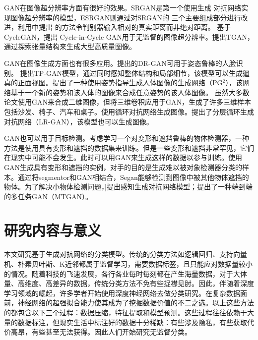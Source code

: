 GAN在图像超分辨率方面有很好的效果。SRGAN\cite{ledig2017photo}是第一个使用生成
对抗网络实现图像超分辨率的模型，ESRGAN\cite{wang2018esrgan}则通过对SRGAN的
三个主要组成部分进行改进，利用\citet{jolicoeur2018relativistic}中提出
的方法令判别器输入相对的真实距离而非绝对距离。
基于CycleGAN\cite{zhu2017unpaired}，\citet{yuan2018unsupervised}提出
Cycle-in-Cycle GAN用于无监督的图像超分辨率。\citet{ding2019tgan}提出TGAN，
通过探索张量结构来生成大型高质量图像。

GAN在图像生成方面也有很多应用。\citet{tran2017disentangled}提出的DR-GAN可用于姿态鲁棒的人脸识别。
\citet{huang2017beyond}提出TP-GAN模型，通过同时感知整体结构和局部细节，该模型可以生成逼真的正面视图。\citet{ma2017pose}提出了一种使用姿势指导生成人体图像的生成网络（PG$^2$），该网络基于一个新的姿势和该人体的图像来合成任意姿势的该人体图像。
虽然大多数论文使用GAN来合成二维图像\cite{bao2017cvae,dong2017semantic}，但\citet{wu2016learning}将三维卷积应用于GAN，生成了许多三维样本包括沙发、椅子、汽车和桌子。\citet{im2016generating}使用循环对抗网络生成图像。\citet{yang2017lr}提出了分层循环生成对抗网络（LR-GAN），该模型也可以生成图像。

GAN也可以用于目标检测。考虑学习一个对变形和遮挡鲁棒的物体检测器，一种方法是使用具有变形和遮挡的数据集来训练。但是一些变形和遮挡非常罕见，它们在现实中可能不会发生。此时可以用GAN来生成这样的数据以参与训练。\citet{wang2017fast}使用GAN生成具有变形和遮挡的实例，对手的目的是生成难以被对象检测器分类的样本。通过将segmentor和GAN相结合，Segan\cite{ehsani2018segan}能够检测到图像中被其他物体遮挡的物体。为了解决小物体检测问题，\citet{li2017perceptual}]提出感知生成对抗网络模型；\citet{bai2018sod}提出了一种端到端的多任务GAN（MTGAN）。

\section{研究内容与意义}
本文研究基于生成对抗网络的分类模型。传统的分类方法如逻辑回归、支持向量机、朴素贝叶斯、K近邻都属于监督学习，需要数据标签，且只能应对数据量较小的情况。随着科技的飞速发展，各行各业每时每刻都在产生海量数据，对于大体量、高维度、高差异的数据，传统分类方法不免有些捉襟见肘。因此，伴随着深度学习领域的崛起，许多学者开始使用深度神经网络去做分类研究\cite{krizhevsky2012imagenet,taigman2014deepface}。在复杂数据面前，神经网络的超强拟合能力使其成为了挖掘数据价值的不二之选。以上这些方法的都包含以下三个过程：数据压缩，特征提取和模型预测。这些过程往往依赖于大量的数据标注，但现实生活中标注好的数据十分稀缺：有些涉及隐私，有些获取代价高昂，有些甚至无法获得。因此人们开始研究无监督分类。

